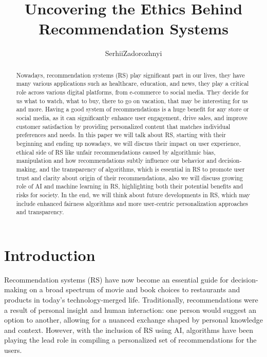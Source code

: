 \documentclass{article}
\title{Uncovering the Ethics Behind Recommendation Systems}
\author{Serhii\;Zadorozhnyi}
\begin{document}
\maketitle
\textbf{}

\begin{abstract}
Nowadays, recommendation systems (RS) play significant part in our lives, they have many various applications such as healthcare, education, and news, they play a critical role across various digital platforms, from e-commerce to social media. They decide for us what to watch, what to buy, there to go on vacation, that may be interesting for us and more. Having a good system of recommendations is a huge benefit for any store or social media, as it can significantly enhance user engagement, drive sales, and improve customer satisfaction by providing personalized content that matches individual preferences and needs. In this paper we will talk about RS, starting with their beginning and ending up nowadays, we will discuss their impact on user experience, ethical side of RS like unfair recommendations caused by algorithmic bias, manipulation and how recommendations subtly influence our behavior and decision-making, and the transparency of algorithms, which is essential in RS to promote user trust and clarity about origin of their recommendations, also we will discuss growing role of AI and machine learning in RS, highlighting both their potential benefits and risks for society. In the end, we will think about future developments in RS, which may include enhanced fairness algorithms and more user-centric personalization approaches and transparency.
\end{abstract}


\section{Introduction}
Recommendation systems (RS) have now become an essential guide for decision-making on a broad spectrum of movie and book choices to restaurants and products in today's technology-merged life. Traditionally, recommendations were a result of personal insight and human interaction: one person would suggest an option to another, allowing for a nuanced exchange shaped by personal knowledge and context. However, with the inclusion of RS using AI, algorithms have been playing the lead role in compiling a personalized set of recommendations for the users.
\end{document}
